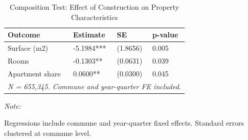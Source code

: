 \begin{table}[!h]
\centering
\caption{\label{tab:tab:composition}Composition Test: Effect of Construction on Property Characteristics}
\centering
\begin{threeparttable}
\begin{tabular}[t]{llll}
\toprule
Outcome & Estimate & SE & p-value\\
\midrule
Surface (m2) & -5.1984*** & (1.8656) & 0.005\\
Rooms & -0.1303** & (0.0631) & 0.039\\
Apartment share & 0.0600** & (0.0300) & 0.045\\
\midrule
\multicolumn{4}{l}{\textit{N = 655,345. Commune and year-quarter FE included.}}\\
\bottomrule
\end{tabular}
\begin{tablenotes}
\item \textit{Note: } 
\item Regressions include commune and year-quarter fixed effects. Standard errors clustered at commune level.
\end{tablenotes}
\end{threeparttable}
\end{table}
